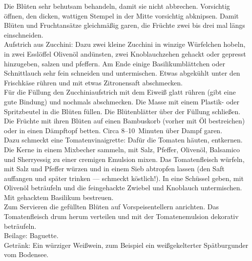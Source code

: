 
      \begin{zubereitung}
        Die Blüten sehr behutsam behandeln, damit sie nicht abbrechen.
	Vorsichtig öffnen, den dicken, wattigen Stempel in der Mitte vorsichtig
	abknipsen. Damit Blüten und Fruchtansätze gleichmäßig garen, die
	Früchte zwei bis drei mal längs einschneiden. \\
        Aufstrich aus Zucchini: Dazu zwei kleine Zucchini in winzige Würfelchen
	hobeln, in zwei Esslöffel Olivenöl andünsten, zwei Knoblauchzehen
	gehackt oder gepresst hinzugeben, salzen und pfeffern. Am Ende einige
	Basilikumblättchen oder Schnittlauch sehr fein schneiden und
	untermischen. Etwas abgekühlt unter den Frischkäse rühren und mit etwas
	Zitronensaft abschmecken. \\
        Für die Füllung den Zucchiniaufstrich mit dem Eiweiß glatt rühren (gibt
	eine gute Bindung) und nochmals abschmecken. Die Masse mit einem
	Plastik- oder Spritzbeutel in die Blüten füllen. Die Blütenblätter über
	der Füllung schließen. \\
        Die Früchte mit ihren Blüten auf einen Bambuskorb (vorher mit Öl
	bestreichen) oder in einen Dämpftopf betten. Circa 8--10~Minuten über
	Dampf garen. \\
        Dazu schmeckt eine Tomatenvinaigrette: Dafür die Tomaten häuten,
	entkernen. Die Kerne in einem Mixbecher sammeln, mit Salz, Pfeffer,
	Olivenöl, Balsamico und Sherryessig zu einer cremigen Emulsion mixen.
	Das Tomatenfleisch würfeln, mit Salz und Pfeffer würzen und in einem
	Sieb abtropfen lassen (den Saft auffangen und später trinken ---
	schmeckt köstlich!). In eine Schüssel geben, mit Olivenöl beträufeln
	und die feingehackte Zwiebel und Knoblauch untermischen. Mit gehacktem
	Basilikum bestreuen. \\
        Zum Servieren die gefüllten Blüten auf Vorspeisentellern anrichten. Das
	Tomatenfleisch drum herum verteilen und mit der Tomatenemulsion
	dekorativ beträufeln. \\
        Beilage: Baguette. \\
        Getränk: Ein würziger Weißwein, zum Beispiel ein weißgekelterter
	Spätburgunder vom Bodensee. \\
      \end{zubereitung}

      
